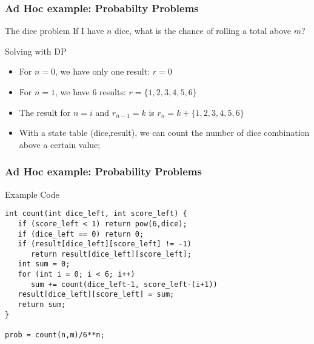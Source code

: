 \documentclass{beamer}
\begin{document}
\begin{frame}
  \frametitle{Ad Hoc example: Probabilty Problems}

  {\smaller
  \begin{block}{The dice problem}
    If I have $n$ dice, what is the chance of rolling a total above $m$?
  \end{block}

  \medskip

  Solving with DP

  \medskip

  \begin{itemize}
  \item For $n=0$, we have only one result: $r=0$
  \item For $n=1$, we have 6 results: $r = \{1,2,3,4,5,6\}$
  \item The result for $n=i$ and $r_{n-1}=k$ is $r_n = k + \{1,2,3,4,5,6\}$

    \bigskip

  \item With a state table (dice,result), we can count the number of
    dice combination above a certain value;

  \end{itemize}
  }
\end{frame}

\begin{frame}[fragile]
  \frametitle{Ad Hoc example: Probability Problems}
  \begin{exampleblock}{Example Code}
{\small
\begin{verbatim}
int count(int dice_left, int score_left) {
   if (score_left < 1) return pow(6,dice);
   if (dice_left == 0) return 0;
   if (result[dice_left][score_left] != -1)
      return result[dice_left][score_left];
   int sum = 0;
   for (int i = 0; i < 6; i++)
      sum += count(dice_left-1, score_left-(i+1))
   result[dice_left][score_left] = sum;
   return sum;
}

prob = count(n,m)/6**n;

\end{verbatim}
}
  \end{exampleblock}
\end{frame}

%
%
%
\end{document}
